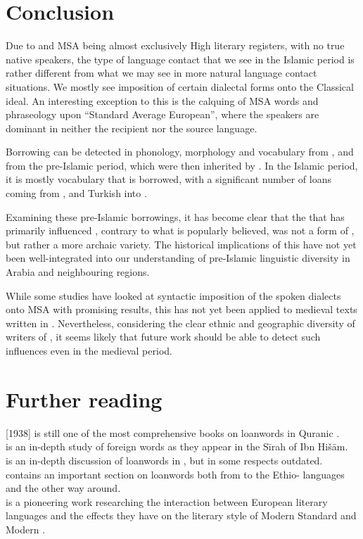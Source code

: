 \documentclass[output=paper]{langsci/langscibook}
\begin{document}
\section{Conclusion}

Due to  and MSA being almost exclusively High literary registers, with no true native speakers, the type of language contact that we see in the Islamic period is rather different from what we may see in more natural language contact situations. We mostly see {imposition} of certain dialectal forms onto the Classical ideal. An interesting exception to this is the {calquing} of MSA words and phraseology upon “Standard Average European”, where the speakers are dominant in neither the recipient nor the {source language}.

Borrowing can be detected in phonology, morphology and vocabulary from ,  and  from the pre-Islamic period, which were then inherited by . In the Islamic period, it is mostly vocabulary that is borrowed, with a significant number of loans coming from ,  and  {Turkish} into .

Examining these pre-Islamic borrowings, it has become clear that the  that has primarily influenced , contrary to what is popularly believed, was not a form of , but rather a more archaic variety. The historical implications of this have not yet been well-integrated into our understanding of pre-Islamic linguistic diversity in Arabia and neighbouring regions.

While some studies have looked at syntactic {imposition} of the spoken dialects onto MSA with promising results, this has not yet been applied to medieval texts written in . Nevertheless, considering the clear ethnic and geographic diversity of writers of , it seems likely that {future} work should be able to detect such influences even in the medieval period.

\section*{Further reading}

\citet{Jeffrey2007} [1938] is still one of the most comprehensive books on {loanwords} in Quranic .\\
\citet{Hebbo1984} is an in-depth study of foreign words as they appear in the Sīrah of Ibn Hišām.\\
\citet{Fraenkel1886} is an in-depth discussion of  {loanwords} in , but in some respects outdated.\\
\citet{Nöldeke1910} contains an important section on {loanwords} both from  to the Ethio- languages and the other way around.\\
\citet{Blau1969} is a pioneering work researching the interaction between European literary languages and the effects they have on the literary style of Modern Standard  and Modern .
\end{document}
